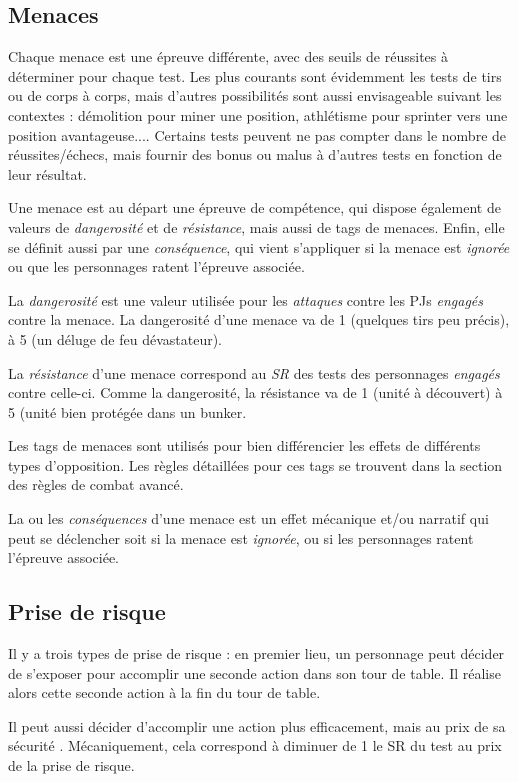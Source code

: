 \documentclass{report}
\begin{document}
\begin{multicols}{2}
\subsection{Menaces}
Chaque menace est une épreuve différente, avec des seuils de réussites à déterminer pour chaque test. Les plus courants sont évidemment les tests de tirs ou de corps à corps, mais d'autres possibilités sont aussi envisageable suivant les contextes : démolition pour miner une position, athlétisme pour sprinter vers une position avantageuse.... Certains tests peuvent ne pas compter dans le nombre de réussites/échecs, mais fournir des bonus ou malus à d'autres tests en fonction de leur résultat.

Une menace est au départ une épreuve de compétence, qui dispose également de valeurs de \emph{dangerosité} et de \emph{résistance}, mais aussi de tags de menaces. Enfin, elle se définit aussi par une \emph{conséquence}, qui vient s'appliquer si la menace est \emph{ignorée} ou que les personnages ratent l'épreuve associée.

La \emph{dangerosité} est une valeur utilisée pour les \emph{attaques} contre les PJs \emph{engagés} contre la menace. La dangerosité d'une menace va de 1 (quelques tirs peu précis), à 5 (un déluge de feu dévastateur).

La \emph{résistance} d'une menace correspond au \emph{SR} des tests des personnages \emph{engagés} contre celle-ci. Comme la dangerosité, la résistance va de 1 (unité à découvert) à 5 (unité bien protégée dans un bunker.

Les tags de menaces sont utilisés pour bien différencier les effets de différents types d'opposition. Les règles détaillées pour ces tags se trouvent dans la section des règles de combat avancé.

La ou les \emph{conséquences} d'une menace est un effet mécanique et/ou narratif qui peut se déclencher soit si la menace est \emph{ignorée}, ou si les personnages ratent l'épreuve associée.



\subsection{Prise de risque}
\label{risque}
Il y a trois types de prise de risque : en premier lieu, un personnage peut décider de s'exposer pour accomplir une seconde action dans son tour de table. Il réalise alors cette seconde action à la fin du tour de table.

Il peut aussi décider d'accomplir une action plus efficacement, mais au prix de sa sécurité . Mécaniquement, cela correspond à diminuer de 1 le SR du test au prix de la prise de risque.


\end{multicols}
\end{document}
